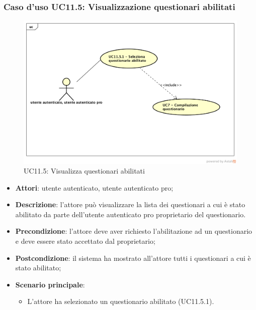\subsubsection{Caso d'uso UC11.5: Visualizzazione questionari abilitati}
\label{UC11.5}
\begin{figure}[h]
	\centering
	\includegraphics[scale=0.5]{UML/UC11_5.png}
	\caption{UC11.5: Visualizza questionari abilitati}
\end{figure}
\begin{itemize}
\item\textbf{Attori}: utente autenticato, utente autenticato pro;
\item\textbf{Descrizione}: l'attore può visualizzare la lista dei questionari a cui è stato abilitato da parte dell'utente autenticato pro proprietario del questionario.
\item\textbf{Precondizione}: l'attore deve aver richiesto l'abilitazione ad un questionario e deve essere stato accettato dal proprietario;
\item\textbf{Postcondizione}: il sistema ha mostrato all'attore tutti i questionari a cui è stato abilitato;
\item\textbf{Scenario principale}: 
\begin{itemize}
\item L'attore ha selezionato un questionario abilitato (UC11.5.1).
\end{itemize} 
\end{itemize}

